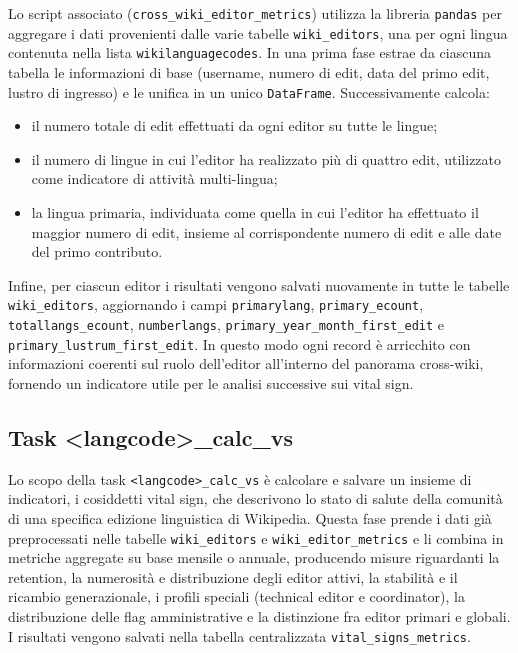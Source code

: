 Lo script associato (\texttt{cross\_wiki\_editor\_metrics}) utilizza la libreria \texttt{pandas} per aggregare i dati provenienti dalle varie tabelle \texttt{wiki\_editors}, una per ogni lingua contenuta nella lista \texttt{wikilanguagecodes}. In una prima fase estrae da ciascuna tabella le informazioni di base (username, numero di edit, data del primo edit, lustro di ingresso) e le unifica in un unico \texttt{DataFrame}. Successivamente calcola:
\begin{itemize}
    \item il numero totale di edit effettuati da ogni editor su tutte le lingue;
    \item il numero di lingue in cui l’editor ha realizzato più di quattro edit, utilizzato come indicatore di attività multi-lingua;
    \item la lingua primaria, individuata come quella in cui l’editor ha effettuato il maggior numero di edit, insieme al corrispondente numero di edit e alle date del primo contributo.
\end{itemize}

Infine, per ciascun editor i risultati vengono salvati nuovamente in tutte le tabelle \texttt{wiki\_editors}, aggiornando i campi \texttt{primarylang}, \texttt{primary\_ecount}, \texttt{totallangs\_ecount}, \texttt{numberlangs}, \texttt{primary\_year\allowbreak\_month\_first\_edit} e \texttt{primary\_lustrum\_first\_edit}. In questo modo ogni record è arricchito con informazioni coerenti sul ruolo dell’editor all’interno del panorama cross-wiki, fornendo un indicatore utile per le analisi successive sui vital sign.

\subsection{Task \textless langcode\textgreater\_calc\_vs}
\label{subsec:calc_vs}

Lo scopo della task \texttt{<langcode>\_calc\_vs} è calcolare e salvare un insieme di indicatori, i cosiddetti vital sign, che descrivono lo stato di salute della comunità di una specifica edizione linguistica di Wikipedia. 
Questa fase prende i dati già preprocessati nelle tabelle \texttt{wiki\_editors} e \texttt{wiki\_editor\_metrics} e li combina in metriche aggregate su base mensile o annuale, producendo misure riguardanti la retention, la numerosità e distribuzione degli editor attivi, la stabilità e il ricambio generazionale, i profili speciali (technical editor e coordinator), la distribuzione delle flag amministrative e la distinzione fra editor primari e globali. 
I risultati vengono salvati nella tabella centralizzata \texttt{vital\_signs\_metrics}.

